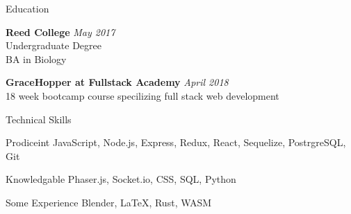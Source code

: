 \documentclass{resume} %
\begin{document}
    
    
    \begin{rSection}{Education}
    
    {\bf Reed College} \hfill {\em May 2017} 
    \\ Undergraduate Degree
    \\ BA in Biology 

    {\bf GraceHopper at Fullstack Academy} \hfill {\em April 2018} 
    \\ 18 week bootcamp course specilizing full stack web development  
    
    
    \end{rSection}
    
    \begin{rSection}{Technical Skills}
    
    {Prodiceint} \hspace{10ex} {{ JavaScript},{ Node.js}, { Express},{ Redux},{ React},
    { Sequelize},{ PostrgreSQL},{ Git}}
    
    {Knowledgable} \hspace{6ex} {{ Phaser.js},{ Socket.io},{ CSS},{ SQL}, {Python}{}}

    {Some Experience} \hspace{4ex} {{Blender}, \LaTeX,{ Rust}, { WASM}}
    


    \end{rSection}
    
    
    
\end{document}
